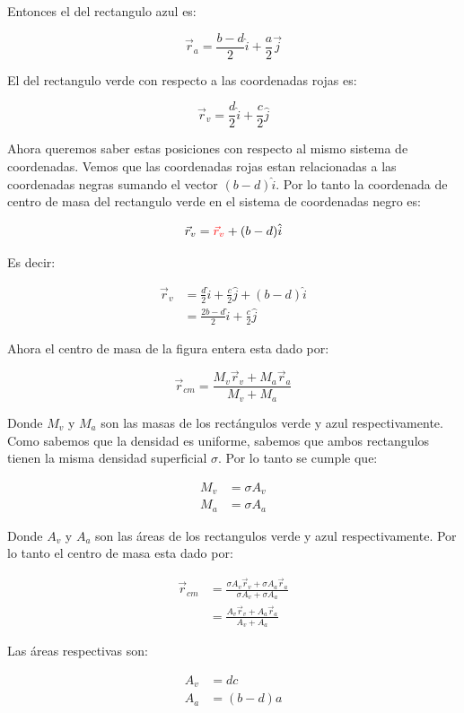 \documentclass[a4paper,11pt]{article}
\theoremstyle{mytheor}
\begin{document}
Entonces el del rectangulo azul es:

$$ \vec{r}_a = \frac{b-d}{2} \hat{i} + \frac{a}{2} \vec{j}  $$

El del rectangulo verde con respecto a las coordenadas rojas es:

\color{red}

$$ \vec{r}_v = \frac{d}{2} \hat{i} + \frac{c}{2}\hat{j}$$

\color{black}
Ahora queremos saber estas posiciones con respecto al mismo sistema de coordenadas. Vemos que las coordenadas rojas estan relacionadas a las coordenadas negras sumando el vector $(b-d) \hat{i}$. Por lo tanto la coordenada de centro de masa del rectangulo verde en el sistema de coordenadas negro es:

$$ \vec{r}_v = \color{red} \vec{r}_v \color{black}+ (b-d)\hat{i}$$

Es decir:

\begin{align*}
 \vec{r}_v &= \frac{d}{2} \hat{i} + \frac{c}{2}\hat{j} +  (b-d)\hat{i}\\
 &=  \frac{2b-d}{2}\hat{i} + \frac{c}{2}\hat{j} 
\end{align*}

Ahora el centro de masa de la figura entera esta dado por:

$$ \vec{r}_{cm} = \frac{ M_v \vec{r}_v+ M_a \vec{r}_a}{M_v + M_a}$$

Donde $M_v$ y $M_a$ son las masas de los rectángulos verde y azul respectivamente. Como sabemos que la densidad es uniforme, sabemos que ambos rectangulos tienen la misma densidad superficial $\sigma$. Por lo tanto se cumple que:

\begin{align*}
M_v &= \sigma A_v\\
M_a &= \sigma A_a
\end{align*}

Donde $A_v$ y $A_a$ son las áreas de los rectangulos verde y azul respectivamente. Por lo tanto el centro de masa esta dado por:

\begin{align*}
 \vec{r}_{cm} &= \frac{ \sigma A_v \vec{r}_v+ \sigma A_a \vec{r}_a}{\sigma A_v + \sigma A_a} \\
 & = \frac{  A_v \vec{r}_v+  A_a \vec{r}_a}{ A_v +  A_a}
\end{align*}

Las áreas respectivas son:

\begin{align*}
A_v & = dc\\
A_a & = (b-d)a
\end{align*}
\end{document}
